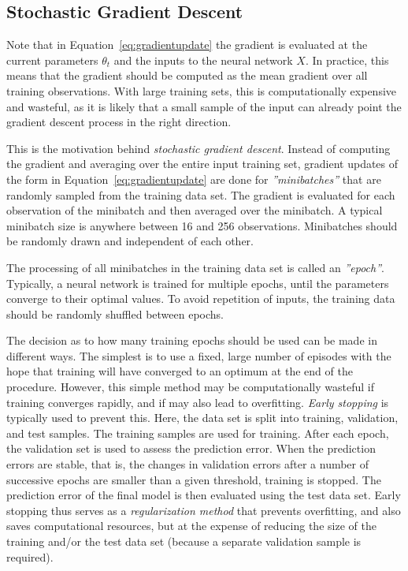 \subsection{Stochastic Gradient Descent}

Note that in Equation~\ref{eq:gradientupdate} the gradient is evaluated at the current parameters $\theta_t$ and the inputs to the neural network $X$. In practice, this means that the gradient should be computed as the mean gradient over all training observations. With large training sets, this is computationally expensive and wasteful, as it is likely that a small sample of the input can already point the gradient descent process in the right direction. 

This is the motivation behind \emph{stochastic gradient descent}. Instead of computing the gradient and averaging over the entire input training set, gradient updates of the form in Equation~\ref{eq:gradientupdate} are done for \emph{''minibatches''} that are randomly sampled from the training data set. The gradient is evaluated for each observation of the minibatch and then averaged over the minibatch. A typical minibatch size is anywhere between 16 and 256 observations. Minibatches should be randomly drawn and independent of each other. 

The processing of all minibatches in the training data set is called an \emph{''epoch''}. Typically, a neural network is trained for multiple epochs, until the parameters converge to their optimal values. To avoid repetition of inputs, the training data should be randomly shuffled between epochs.

The decision as to how many training epochs should be used can be made in different ways. The simplest is to use a fixed, large number of episodes with the hope that training will have converged to an optimum at the end of the procedure. However, this simple method may be computationally wasteful if training converges rapidly, and if may also lead to overfitting. \emph{Early stopping} is typically used to prevent this. Here, the data set is split into training, validation, and test samples. The training samples are used for training. After each epoch, the validation set is used to assess the prediction error. When the prediction errors are stable, that is, the changes in validation errors after a number of successive epochs are smaller than a given threshold, training is stopped. The prediction error of the final model is then evaluated using the test data set. Early stopping thus serves as a \emph{regularization method} that prevents overfitting, and also saves computational resources, but at the expense of reducing the size of the training and/or the test data set (because a separate validation sample is required).

